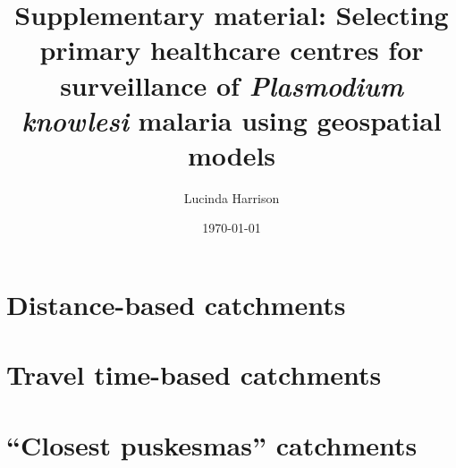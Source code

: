 \documentclass{article}
\title{Supplementary material: Selecting primary healthcare centres for surveillance of \textit{Plasmodium knowlesi} malaria using geospatial models}
\author{Lucinda Harrison}
\date{\today}
\begin{document}
\maketitle

\tableofcontents

\newpage

\section{Distance-based catchments}



\section{Travel time-based catchments}



\section{``Closest puskesmas'' catchments}


\end{document}

